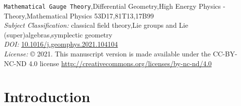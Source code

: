 \documentclass[preprint]{elsarticle}
\theoremstyle{plain}
\theoremstyle{remark}
\theoremstyle{definition}
\begin{document}
\begin{frontmatter}
\begin{keyword}
\texttt{Mathematical Gauge Theory}\sep Differential Geometry\sep High Energy Physics - Theory\sep Mathematical Physics
\MSC[2020] 53D17\sep 81T13\sep 17B99 \\
\textit{Subject Classification:} classical field theory\sep Lie groups and Lie (super)algebras\sep symplectic geometry \\
\textit{DOI:} \href{https://doi.org/10.1016/j.geomphys.2021.104104}{10.1016/j.geomphys.2021.104104}\\
\textit{License:} © 2021. This manuscript version is made available under the CC-BY-NC-ND 4.0 license \url{http://creativecommons.org/licenses/by-nc-nd/4.0}
\end{keyword}

\end{frontmatter}



\newpage


\tableofcontents






\setlength{\parindent}{12 pt}




\section{Introduction}
\end{document}
